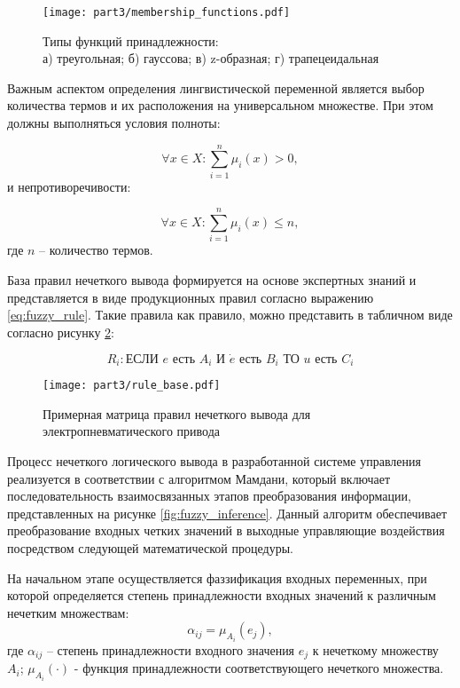\begin{figure}[ht]
	\centering
	\texttt{[image: part3/membership\_functions.pdf]}
	\caption{Типы функций принадлежности:\\
		а) треугольная; б) гауссова; в) z-образная; г) трапецеидальная}
	\label{fig:membership_functions_types}
\end{figure}

Важным аспектом определения лингвистической переменной является выбор
количества термов и их расположения
на универсальном множестве. При этом должны выполняться условия полноты:

\begin{equation*}
	\forall x \in X: \sum_{i=1}^n \mu_i(x) > 0,
\end{equation*}
и непротиворечивости:

\begin{equation}
	\forall x \in X: \sum_{i=1}^n \mu_i(x) \leq n,
\end{equation}
где $n$ -- количество термов.

База правил нечеткого вывода формируется на основе экспертных знаний
и представляется в виде продукционных правил согласно выражению \ref{eq:fuzzy_rule}. Такие правила как правило,
можно представить в табличном виде согласно рисунку \ref{fig:fuzzy_rules}:

\begin{equation}\label{eq:fuzzy_rule}
	R_i: \text{ЕСЛИ } e \text{ есть } A_i \text{ И } \dot{e} \text{ есть } B_i \text{ ТО } u \text{ есть } C_i
\end{equation}

\begin{figure}[ht]
	\centering
	\texttt{[image: part3/rule\_base.pdf]}
	\caption{Примерная матрица правил нечеткого вывода для электропневматического привода}
	\label{fig:fuzzy_rules}
\end{figure}

Процесс нечеткого логического вывода в разработанной системе управления реализуется в
соответствии с алгоритмом Мамдани, который включает последовательность
взаимосвязанных этапов преобразования информации, представленных на рисунке \ref{fig:fuzzy_inference}. Данный алгоритм
обеспечивает преобразование входных четких значений в выходные управляющие воздействия посредством
следующей математической процедуры.

На начальном этапе осуществляется фаззификация входных переменных, при которой определяется
степень принадлежности входных значений к различным нечетким множествам:
\begin{equation*}
	\alpha_{ij} = \mu_{A_i}(e_j),
\end{equation*}
где $\alpha_{ij}$ -- степень принадлежности входного значения $e_j$ к нечеткому множеству $A_i$;
$\mu_{A_i}(\cdot)$ - функция принадлежности соответствующего нечеткого множества.

